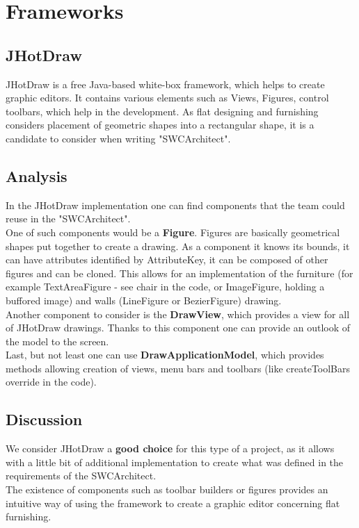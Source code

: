 \section{Frameworks}
	
		\subsection{JHotDraw}
			JHotDraw is a free Java-based white-box framework, which helps to create graphic editors. It contains various elements such as Views, Figures, control toolbars, which help in the development. As flat designing and furnishing considers placement of geometric shapes into a rectangular shape, it is a candidate to consider when writing "SWCArchitect".
		
		\subsection{Analysis}
			In the JHotDraw implementation one can find components that the team could reuse in the "SWCArchitect".\\
			One of such components would be a \textbf{Figure}. Figures are basically geometrical shapes put together to create a drawing. As a component it knows its bounds, it can have attributes identified by AttributeKey, it can be composed of other figures and can be cloned. This allows for an implementation of the furniture (for  example TextAreaFigure - see chair in the code, or ImageFigure, holding a buffored image) and walls (LineFigure or BezierFigure) drawing.\\
			Another component to consider is the \textbf{DrawView}, which provides a view for all of JHotDraw drawings. Thanks to this component one can provide an outlook of the model to the screen.\\
			Last, but not least one can use \textbf{DrawApplicationModel}, which provides methods allowing creation of views, menu bars and toolbars (like createToolBars override in the code).
			
		\subsection{Discussion}
			We consider JHotDraw a \textbf{good choice} for this type of a project, as it allows with a little bit of additional implementation to create what was defined in the requirements of the SWCArchitect.\\
			The existence of components such as toolbar builders or figures provides an intuitive way of using the framework to create a graphic editor concerning flat furnishing.